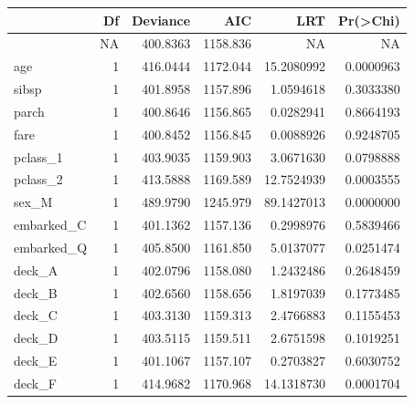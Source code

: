 \documentclass[
  letterpaper,
  DIV=11,
  numbers=noendperiod]{scrartcl}
\newenvironment{Shaded}{\begin{snugshade}}{\end{snugshade}}
\newcommand{\AttributeTok}[1]{\textcolor[rgb]{0.40,0.45,0.13}{#1}}
\newcommand{\CommentTok}[1]{\textcolor[rgb]{0.37,0.37,0.37}{#1}}
\newcommand{\FunctionTok}[1]{\textcolor[rgb]{0.28,0.35,0.67}{#1}}
\newcommand{\NormalTok}[1]{\textcolor[rgb]{0.00,0.23,0.31}{#1}}
\newcommand{\OtherTok}[1]{\textcolor[rgb]{0.00,0.23,0.31}{#1}}
\newcommand{\SpecialCharTok}[1]{\textcolor[rgb]{0.37,0.37,0.37}{#1}}
\newcommand{\StringTok}[1]{\textcolor[rgb]{0.13,0.47,0.30}{#1}}
\begin{document}
\begin{longtable}[]{@{}lrrrrr@{}}
\toprule\noalign{}
& Df & Deviance & AIC & LRT & Pr(\textgreater Chi) \\
\midrule\noalign{}
\endhead
\bottomrule\noalign{}
\endlastfoot
& NA & 400.8363 & 1158.836 & NA & NA \\
age & 1 & 416.0444 & 1172.044 & 15.2080992 & 0.0000963 \\
sibsp & 1 & 401.8958 & 1157.896 & 1.0594618 & 0.3033380 \\
parch & 1 & 400.8646 & 1156.865 & 0.0282941 & 0.8664193 \\
fare & 1 & 400.8452 & 1156.845 & 0.0088926 & 0.9248705 \\
pclass\_1 & 1 & 403.9035 & 1159.903 & 3.0671630 & 0.0798888 \\
pclass\_2 & 1 & 413.5888 & 1169.589 & 12.7524939 & 0.0003555 \\
sex\_M & 1 & 489.9790 & 1245.979 & 89.1427013 & 0.0000000 \\
embarked\_C & 1 & 401.1362 & 1157.136 & 0.2998976 & 0.5839466 \\
embarked\_Q & 1 & 405.8500 & 1161.850 & 5.0137077 & 0.0251474 \\
deck\_A & 1 & 402.0796 & 1158.080 & 1.2432486 & 0.2648459 \\
deck\_B & 1 & 402.6560 & 1158.656 & 1.8197039 & 0.1773485 \\
deck\_C & 1 & 403.3130 & 1159.313 & 2.4766883 & 0.1155453 \\
deck\_D & 1 & 403.5115 & 1159.511 & 2.6751598 & 0.1019251 \\
deck\_E & 1 & 401.1067 & 1157.107 & 0.2703827 & 0.6030752 \\
deck\_F & 1 & 414.9682 & 1170.968 & 14.1318730 & 0.0001704 \\
\end{longtable}

\begin{Shaded}
\end{Shaded}
\end{document}
